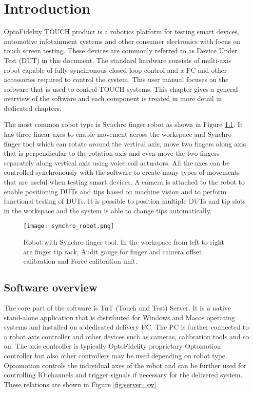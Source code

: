 \chapter{Introduction}

OptoFidelity TOUCH product is a robotics platform for testing smart devices, automotive infotainment systems and other consumer electronics with focus on touch screen testing. These devices are commonly referred to as Device Under Test (DUT) in this document. The standard hardware consists of multi-axis robot capable of fully synchronous closed-loop control and a PC and other accessories required to control the system. This user manual focuses on the software that is used to control TOUCH systems. This chapter gives a general overview of the software and each component is treated in more detail in dedicated chapters.

The most common robot type is Synchro finger robot as shown in Figure \ref{fig:synchro_robot}. It has three linear axes to enable movement across the workspace and Synchro finger tool which can rotate around the vertical axis, move two fingers along axis that is perpendicular to the rotation axis and even move the two fingers separately along vertical axis using voice coil actuators. All the axes can be controlled synchronously with the software to create many types of movements that are useful when testing smart devices. A camera is attached to the robot to enable positioning DUTs and tips based on machine vision and to perform functional testing of DUTs. It is possible to position multiple DUTs and tip slots in the workspace and the system is able to change tips automatically.

\begin{figure}[!h]
	\centering
	\texttt{[image: synchro\_robot.png]}
	\caption{Robot with Synchro finger tool. In the workspace from left to right are finger tip rack, Audit gauge for finger and camera offset calibration and Force calibration unit.}
	\label{fig:synchro_robot}
\end{figure}

\section{Software overview}

The core part of the software is TnT (Touch and Test) Server. It is a native stand-alone application that is distributed for Windows and Macos operating systems and installed on a dedicated delivery PC. The PC is further connected to a robot axis controller and other devices such as cameras, calibration tools and so on. The axis controller is typically OptoFidelity proprietary Optomotion controller but also other controllers may be used depending on robot type. Optomotion controls the individual axes of the robot and can be further used for controlling IO channels and trigger signals if necessary for the delivered system. These relations are shown in Figure \ref{fig:server_sw}.

